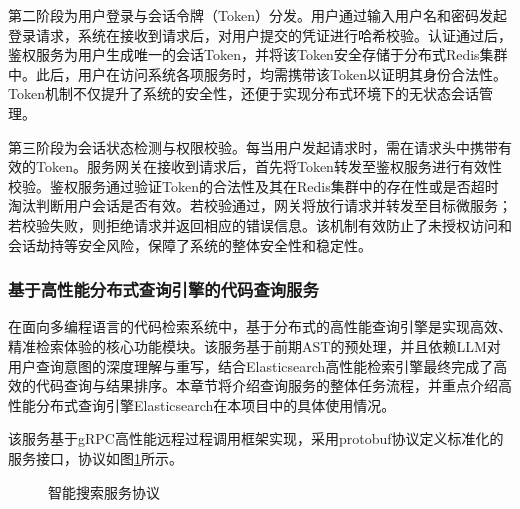 \documentclass[UTF8,a4paper,12pt]{ctexart}
\numberwithin{equation}{section}
\begin{document}
第二阶段为用户登录与会话令牌（Token）分发。用户通过输入用户名和密码发起登录请求，系统在接收到请求后，对用户提交的凭证进行哈希校验。认证通过后，鉴权服务为用户生成唯一的会话Token，并将该Token安全存储于分布式Redis集群中。此后，用户在访问系统各项服务时，均需携带该Token以证明其身份合法性。Token机制不仅提升了系统的安全性，还便于实现分布式环境下的无状态会话管理。\par
第三阶段为会话状态检测与权限校验。每当用户发起请求时，需在请求头中携带有效的Token。服务网关在接收到请求后，首先将Token转发至鉴权服务进行有效性校验。鉴权服务通过验证Token的合法性及其在Redis集群中的存在性或是否超时淘汰判断用户会话是否有效。若校验通过，网关将放行请求并转发至目标微服务；若校验失败，则拒绝请求并返回相应的错误信息。该机制有效防止了未授权访问和会话劫持等安全风险，保障了系统的整体安全性和稳定性。
\subsubsection{基于高性能分布式查询引擎的代码查询服务}
在面向多编程语言的代码检索系统中，基于分布式的高性能查询引擎是实现高效、精准检索体验的核心功能模块。该服务基于前期AST的预处理，并且依赖LLM对用户查询意图的深度理解与重写，结合Elasticsearch高性能检索引擎最终完成了高效的代码查询与结果排序。本章节将介绍查询服务的整体任务流程，并重点介绍高性能分布式查询引擎Elasticsearch在本项目中的具体使用情况。\par
该服务基于gRPC高性能远程过程调用框架实现，采用protobuf协议定义标准化的服务接口，协议如图\ref{search_proto}所示。\par
\begin{figure}[H]
	\caption{智能搜索服务协议}
	\label{search_proto}
\end{figure}
\end{document}

